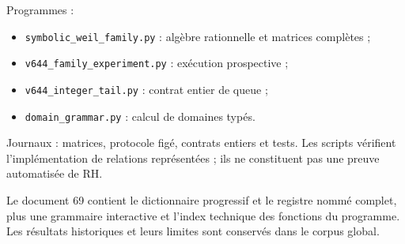 \documentclass[
  10pt,
  a4paper,
]{article}
\providecommand{\tightlist}{%
  \setlength{\itemsep}{0pt}\setlength{\parskip}{0pt}}
\begin{document}
Programmes :

\begin{itemize}
\tightlist
\item
  \texttt{symbolic\_weil\_family.py} : algèbre rationnelle et matrices
  complètes ;
\item
  \texttt{v644\_family\_experiment.py} : exécution prospective ;
\item
  \texttt{v644\_integer\_tail.py} : contrat entier de queue ;
\item
  \texttt{domain\_grammar.py} : calcul de domaines typés.
\end{itemize}

Journaux : matrices, protocole figé, contrats entiers et tests. Les
scripts vérifient l'implémentation de relations représentées ; ils ne
constituent pas une preuve automatisée de RH.

Le document 69 contient le dictionnaire progressif et le registre nommé
complet, plus une grammaire interactive et l'index technique des
fonctions du programme. Les résultats historiques et leurs limites sont
conservés dans le corpus global.
\end{document}
